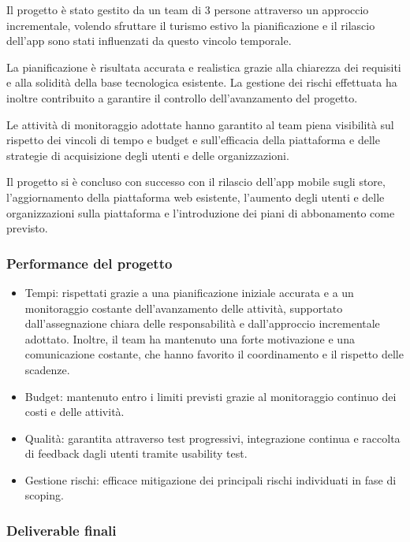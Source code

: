 \documentclass[11pt,a4paper]{article}
\providecommand{\tightlist}{\setlength{\itemsep}{0pt}\setlength{\parskip}{0pt}}
\begin{document}
{Il progetto è stato gestito da un team di 3 persone attraverso un approccio incrementale, volendo sfruttare il turismo estivo la pianificazione e il rilascio dell'app sono stati influenzati da questo vincolo temporale.}

{La pianificazione è risultata accurata e realistica grazie alla chiarezza dei requisiti e alla solidità della base tecnologica esistente. La gestione dei rischi effettuata ha inoltre contribuito a garantire il controllo dell’avanzamento del progetto.}

{Le attività di monitoraggio adottate hanno garantito al team piena visibilità sul rispetto dei vincoli di tempo e budget e sull’efficacia della piattaforma e delle strategie di acquisizione degli utenti e delle organizzazioni.}

{Il progetto si è concluso con successo con il rilascio dell’app mobile sugli store, l’aggiornamento della piattaforma web esistente, l’aumento degli utenti e delle organizzazioni sulla piattaforma e l’introduzione dei piani di abbonamento come previsto.}

{}

\subsubsection*{Performance del progetto}

\begin{itemize}
\tightlist
\item
  {Tempi: rispettati grazie a una pianificazione iniziale accurata e a un monitoraggio costante dell’avanzamento delle attività, supportato dall’assegnazione chiara delle responsabilità e dall’approccio incrementale adottato. Inoltre, il team ha mantenuto una forte motivazione e una comunicazione costante, che hanno favorito il coordinamento e il rispetto delle scadenze.}
\item
  {Budget: mantenuto entro i limiti previsti grazie al monitoraggio continuo dei costi e delle attività.}
\item
  {Qualità: garantita attraverso test progressivi, integrazione continua e raccolta di feedback dagli utenti tramite usability test.}
\item
  {Gestione rischi: efficace mitigazione dei principali rischi individuati in fase di scoping.}
\end{itemize}

{}

\subsubsection*{Deliverable finali}
\end{document}
